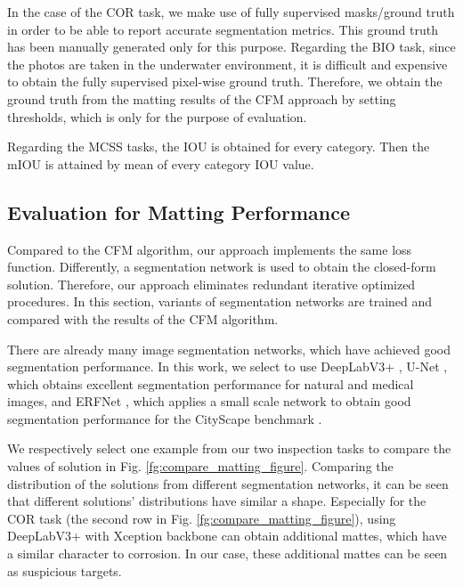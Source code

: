 \documentclass[journal]{IEEEtran}
\begin{document}

In the case of the COR task, we make use of fully supervised masks/ground truth in order to be able to report accurate segmentation metrics. This ground truth has been manually generated only for this purpose. Regarding the BIO task, since the photos are taken in the underwater environment, it is difficult and expensive to obtain the fully supervised pixel-wise ground truth. Therefore, we obtain the ground truth from the matting results of the CFM approach by setting thresholds, which is only for the purpose of evaluation. 

Regarding the MCSS tasks, the IOU is obtained for every category. Then the mIOU is attained by mean of every category IOU value. 

\subsection{Evaluation for Matting Performance}
\label{sec:matting_eval_ins}
Compared to the CFM algorithm, our approach implements the same loss function. Differently, a segmentation network is used to obtain the closed-form solution. Therefore, our approach eliminates redundant iterative optimized procedures. In this section, variants of segmentation networks are trained and compared with the results of the CFM algorithm. 

There are already many image segmentation networks, which have achieved good segmentation performance. In this work, we select to use DeepLabV3+ \cite{chen2018encoder}, U-Net \cite{ronneberger2015u}, which obtains excellent segmentation performance for natural and medical images, and ERFNet \cite{romera2017erfnet}, which applies a small scale network to obtain good segmentation performance for the CityScape benchmark \cite{cordts2016cityscapes}. 

We respectively select one example from our two inspection tasks to compare the values of solution in Fig. \ref{fg:compare_matting_figure}. Comparing the distribution of the solutions from different segmentation networks, it can be seen that different solutions' distributions have similar a shape. Especially for the COR task (the second row in Fig. \ref{fg:compare_matting_figure}), using DeepLabV3+ with Xception backbone can obtain additional mattes, which have a similar character to corrosion. In our case, these additional mattes can be seen as suspicious targets.
\end{document}
